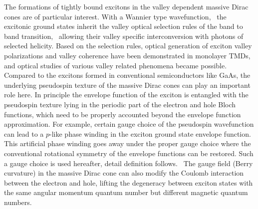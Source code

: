 \documentclass[prb,twocolumn,amsmath,amssymb,superscriptaddress,showpacs]{revtex4}
\begin{document}
The formations of tightly bound excitons in the valley dependent massive Dirac cones are of particular interest. With a Wannier type wavefunction,~\cite{S. Louie MoS2 specturm calculation PRL2013} the excitonic ground states inherit the valley optical selection rules of the band to band transition,~\cite{Yao Coupled Spin Valley 2012, Yao Valleyoptics 08}
allowing their valley specific interconversion with photons of selected helicity.
Based on the selection rules, optical generation of exciton valley polarizations and valley coherence have been demonstrated in monolayer TMDs,~\cite{Valley Coherence nnano2013, Mak Valley polarization nnano2012, Zeng Valley polarization nnano2012, CaoTing Valley physics ncomm2012} and optical studies of various valley related phenomena became possible.~\cite{valley dynamics DSun 2013, Valley lifetime measurement 2014, VHE transisitor 2014, Spin-valley photocurrent 2015} Compared to the excitons formed in conventional semiconductors like GaAs, the underlying pseudospin texture of the massive Dirac cones can play an important role here. In principle the envelope function of the exciton is entangled with the pseudospin texture lying in the periodic part of the electron and hole Bloch functions, which need to be properly accounted beyond the envelope function approximation.
For example, certain gauge choice of the pseudospin wavefunction can lead to a $p$-like phase winding in the exciton ground state envelope function.~\cite{Koch p-state brightness 2015} This artificial phase winding goes away under the proper gauge choice where the conventional rotational symmetry of the envelope functions can be restored. Such a gauge choice is used hereafter, detail definition follows.~\cite{Di Xiao Berry phase and exciton 2015}
The gauge field (Berry curvature) in the massive Dirac cone can also modify the Coulomb interaction between the electron and hole,
lifting the degeneracy between exciton states with the same angular momentum quantum number but different magnetic quantum numbers.~\cite{Excitons in Bilayer Graphene nano2010, Excitons in TI with magnetic gap PRB2011, Di Xiao Berry phase and exciton 2015, Imamoglu p-state Berry splitting 2015}
\end{document}
